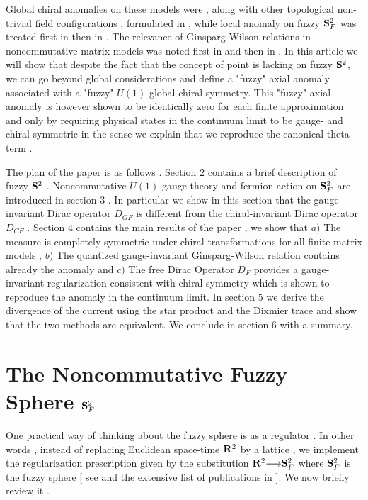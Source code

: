 \documentclass[a4paper,10pt]{article}
\begin{document}
Global chiral anomalies on these models were  , along with other
topological non-trivial field configurations , formulated in
\cite{bal,grosse,balsach} , while local anomaly on fuzzy ${\bf
S}^2_F$ was  treated first in \cite{presnajder} then in \cite{giorgio1,nagao2} . The relevance of Ginsparg-Wilson relations in noncommutative matrix models was noted first in \cite{trg} and \cite{miguel} then in \cite{nagao1} . In this article
we will show that despite the fact that the concept of point is
lacking on fuzzy ${\bf S}^2$, we can go beyond global
considerations and define a "fuzzy" axial anomaly associated with
a "fuzzy" $U(1)$ global chiral symmetry. This "fuzzy" axial
anomaly is however shown to be identically zero for each finite
approximation and only by requiring physical states in the
continuum limit to be gauge- and chiral-symmetric in the sense we explain that we
reproduce the canonical theta term .

The plan of the paper is as follows . Section $2$ contains a
brief description of fuzzy ${\bf S}^2$ . Noncommutative $U(1)$
gauge theory and fermion action on ${\bf S}^2_F$ are introduced
in section $3$ . In particular we show in this section that the
gauge-invariant Dirac operator $D_{GF}$ is different from the
chiral-invariant Dirac operator $D_{CF}$ . Section $4$ contains
the main results of the paper , we show that $a)$ The measure is
completely symmetric under chiral transformations for all finite
matrix models , $b)$ The quantized gauge-invariant Ginsparg-Wilson
relation contains already the anomaly and $c)$ The free Dirac
Operator $D_F$ provides a gauge-invariant regularization
consistent with chiral symmetry which is shown to reproduce the
anomaly in the continuum limit. In section $5$ we derive the
divergence of the current using the star product and the Dixmier
trace and show that the two methods are equivalent.  We conclude
in section $6$ with a summary.








\section{The Noncommutative Fuzzy Sphere ${\bf S}^2_F$}

One practical way of thinking about the fuzzy sphere is as a
regulator . In other words , instead of replacing Euclidean
space-time ${\bf R}^2$ by a lattice , we implement the
regularization prescription given by the substitution ${\bf
R}^2{\longrightarrow}{\bf S}^2_F$ where ${\bf S}^2_F$ is the
fuzzy sphere [ see \cite{madore,GKP} and the extensive list of
publications in \cite{ydri}  ]. We now briefly review it .
\end{document}
